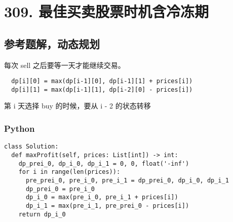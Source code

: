 \newpage
\section{309. 最佳买卖股票时机含冷冻期}
\label{leetcode:309}

\subsection{参考题解，动态规划}

每次 sell 之后要等一天才能继续交易。

\begin{verbatim}
  dp[i][0] = max(dp[i-1][0], dp[i-1][1] + prices[i])
  dp[i][1] = max(dp[i-1][1], dp[i-2][0] - prices[i])
\end{verbatim}

第 i 天选择 buy 的时候，要从 i - 2 的状态转移

\subsubsection{Python}

\begin{verbatim}
class Solution:
  def maxProfit(self, prices: List[int]) -> int:
    dp_prei_0, dp_i_0, dp_i_1 = 0, 0, float('-inf')
    for i in range(len(prices)):
      pre_prei_0, pre_i_0, pre_i_1 = dp_prei_0, dp_i_0, dp_i_1
      dp_prei_0 = pre_i_0
      dp_i_0 = max(pre_i_0, pre_i_1 + prices[i])
      dp_i_1 = max(pre_i_1, pre_prei_0 - prices[i])
    return dp_i_0
\end{verbatim}
